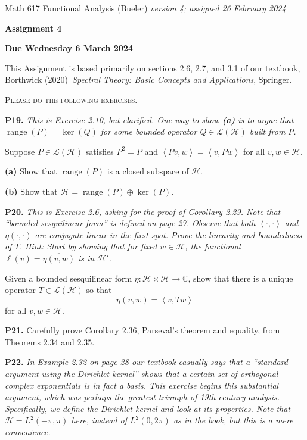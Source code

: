\documentclass[12pt]{amsart}
\newcommand{\cH}{\mathcal{H}}
\newcommand{\cL}{\mathcal{L}}
\newcommand{\CC}{\mathbb{C}}
\newcommand{\ip}[2]{\ensuremath{\left<#1,#2\right>}}
\newcommand{\range}{\operatorname{range}}
\newcommand{\prob}[1]{\bigskip\noindent\textbf{#1.}\quad }
\newcommand{\epart}[1]{\medskip\noindent\textbf{(#1)}\quad }
\begin{document}
\scriptsize \noindent Math 617 Functional Analysis (Bueler) \hfill \emph{version 4; assigned 26 February 2024}
\normalsize\medskip

\Large\centerline{\textbf{Assignment 4}}
\large
\medskip

\centerline{\textbf{Due Wednesday 6 March 2024}}
\medskip
\normalsize

\thispagestyle{empty}

\bigskip
\noindent This Assignment is based primarily on sections 2.6, 2.7, and 3.1 of our textbook, Borthwick (2020)~\emph{Spectral Theory: Basic Concepts and Applications}, Springer.

\medskip
\noindent \textsc{Please do the following exercises.}
\smallskip


\prob{P19}  \emph{This is Exercise 2.10, but clarified.  One way to show \emph{\textbf{(a)}} is to argue that $\range(P)=\ker(Q)$ for some bounded operator $Q\in\cL(\cH)$ built from $P$.}

\medskip\noindent Suppose $P\in\cL(\cH)$ satisfies $P^2=P$ and $\ip{Pv}{w} = \ip{v}{Pw}$ for all $v,w\in\cH$.

\epart{a}  Show that $\range(P)$ is a closed subspace of $\cH$.

\epart{b}  Show that $\cH = \range(P) \oplus \ker(P)$.


\prob{P20}  \emph{This is Exercise 2.6, asking for the proof of Corollary 2.29.  Note that ``bounded sesquilinear form'' is defined on page 27.  Observe that both $\ip{\cdot}{\cdot}$ and $\eta(\cdot,\cdot)$ are conjugate linear in the first spot.  Prove the linearity and boundedness of $T$.  Hint: Start by showing that for fixed $w\in\cH$, the functional $\ell(v) = \overline{\eta(v,w)}$ is in $\cH'$.}

\medskip\noindent Given a bounded sesquilinear form $\eta:\cH\times \cH \to \CC$, show that there is a unique operator $T\in \cL(\cH)$ so that
	$$\eta(v,w) = \ip{v}{Tw}$$
for all $v,w\in\cH$.


\prob{P21}  Carefully prove Corollary 2.36, Parseval's theorem and equality, from Theorems 2.34 and 2.35.


\prob{P22}  \emph{In Example 2.32 on page 28 our textbook casually says that a ``standard argument using the Dirichlet kernel'' shows that a certain set of orthogonal complex exponentials is in fact a basis.  This exercise begins this substantial argument, which was perhaps the greatest triumph of 19th century analysis.  Specifically, we define the Dirichlet kernel and look at its properties.  Note that $\cH=L^2(-\pi,\pi)$ here, instead of $L^2(0,2\pi)$ as in the book, but this is a mere convenience.}
\end{document}
